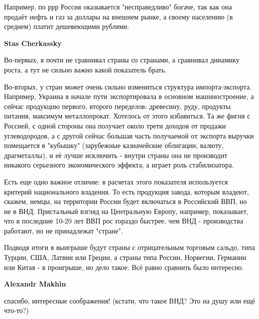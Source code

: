 \begin{itemize}
Например, по ррр Россия оказывается "несправедливо" богаче, так как она продаёт
нефть и газ за доллары на внешнем рынке, а своему населению (в среднем) платит
дешевеющими рублями.

\begin{itemize}
 
\textbf{Stas Cherkassky} 

Во-первых, я почти не сравнивал страны со странами, а сравнивал динамику роста,
а тут не сильно важно какой показатель брать.

Во-вторых, у стран может очень сильно измениться структура импорта-экспорта.
Например, Украина в начале пути экспортировала в основном машиностроение, а
сейчас продукцию первого, второго переделов: древесину, руду, продукты питания,
максимум металлопрокат. Хотелось от этого избавиться. Та же фигня с Россией, с
одной стороны она получает около трети доходов от продажи углеводородов, а с
другой сейчас большая часть получаемой от экспорта выручки помещается в
"кубышку" (зарубежные казначейские облигации, валюту, драгметаллы), и её лучше
исключить - внутри страны она не производит никакого серьезного экономического
эффекта, а играет роль стабилизатора.

Есть еще одно важное отличие: в расчетах этого показателя используется критерий
национального владения. То есть продукция завода, которым владеют, скажем,
немцы, на территории России будет включаться в Российский ВВП, но не в ВНД.
Пристальный взгляд на Центральную Европу, например, показывает, что в последние
10-20 лет ВВП рос гораздо быстрее, чем ВНД - производства работают, но не
принадлежат "стране".

Подводя итоги в выигрыше будут страны с отрицательным торговым сальдо, типа
Турции, США, Латвии или Греции, а страны типа России, Норвегии, Германии или
Китая - в проигрыше, но дело такое. Всё равно сравнить было интересно.

 
\textbf{Alexandr Makhin} 

спасибо, интересные соображения! (кстати, что такое ВНД? Это на душу или ещё что-то?)


\end{itemize}
\end{itemize}
